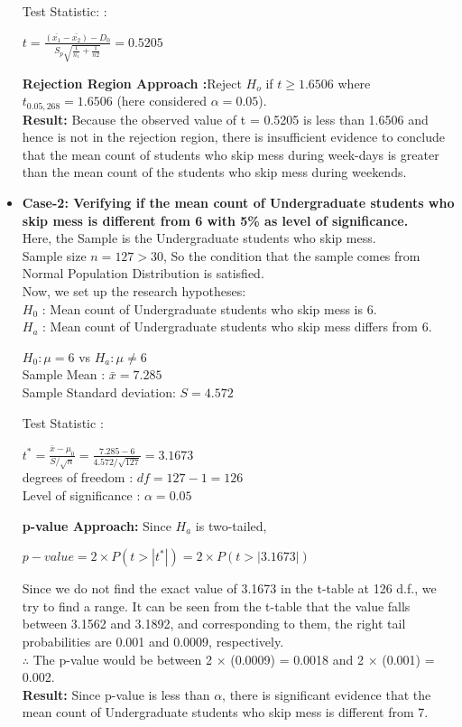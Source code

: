 \documentclass{article}
\begin{document}
\begin{itemize}
Test Statistic: :
\begin{center}
$t = \frac{\left(\bar{x_1}-\bar{x_2}\right) - D_0}{S_p\sqrt{\frac{1}{n_1}+\frac{1}{n2}}} = 0.5205$\\
\end{center}
\textbf{Rejection Region Approach :}Reject $H_o$ if $t \geq 1.6506$ where $t_{0.05,268} = 1.6506$ (here considered $\alpha = 0.05$).\\
\textbf{Result:} Because the observed value of t = 0.5205 is less than 1.6506 and hence is not in the rejection region, there is insufficient evidence to conclude that the mean count of students who skip mess during week-days is greater than the mean count of the students who skip mess during weekends.\\

\item{\textbf{Case-2: Verifying if the mean count of Undergraduate students who skip mess is different from 6 with 5\% as level of significance.}}\\
Here, the Sample is the Undergraduate students who skip mess.\\
Sample size $n = 127 > 30$, So the condition that the sample comes from Normal Population Distribution is satisfied.\\
Now, we set up the research hypotheses:\\
$H_0$ : Mean count of Undergraduate students who skip mess is 6.\\
$H_a$ : Mean count of Undergraduate students who skip mess differs from 6.
\begin{center}
$H_0 : \mu = 6$ \quad vs \quad $H_a : \mu \neq 6$\\
Sample Mean : $\bar{x} = 7.285$\\
Sample Standard deviation: $S = 4.572$
\end{center}
Test Statistic :
\begin{center}
$t^* = \frac{\bar{x}-\mu_0}{S/\sqrt{n}} = \frac{7.285-6}{4.572/\sqrt{127}} = 3.1673$\\
degrees of freedom : $df = 127 - 1 = 126$ \\
Level of significance : $\alpha = 0.05$
\end{center}
\textbf{p-value Approach:}
Since $H_a$ is two-tailed,
\begin{center}
$p-value = 2\times P(t>|t^*|) = 2\times P(t>|3.1673|)$ 
\end{center}
Since we do not find the exact value of 3.1673 in the t-table at 126 d.f., we try to find a range. It can be seen from the t-table that the value falls between 3.1562 and 3.1892, and corresponding to them, the right tail probabilities are 0.001 and 0.0009, respectively.\\
$\therefore$ The p-value would be between 2 × (0.0009) = 0.0018 and 2 × (0.001) = 0.002.\\
\textbf{Result:}
Since p-value is less than $\alpha$, there is significant evidence that the mean count of Undergraduate students who skip mess is different from 7.\\


\end{itemize}
\end{document}
